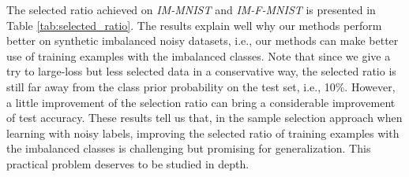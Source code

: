 \documentclass[11pt]{article}
\begin{document}
The selected ratio achieved on \textit{IM-MNIST} and \textit{IM-F-MNIST} is presented in Table \ref{tab:selected_ratio}. The results explain well why our methods perform better on synthetic imbalanced noisy datasets, i.e., our methods can make better use of training examples with the imbalanced classes. Note that since we give a try to large-loss but less selected data in a conservative way, the selected ratio is still far away from the class prior probability on the test set, i.e., 10\%. However, a little improvement of the selection ratio can bring a considerable improvement of test accuracy. These results tell us that, in the sample selection approach when learning with noisy labels, improving the selected ratio of training examples with the imbalanced classes is challenging but promising for generalization. This practical problem deserves to be studied in depth. 
\end{document}
